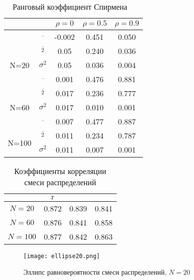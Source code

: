\documentclass[14pt]{extarticle}
\DeclareMathOperator{\pirs}{r} %
\DeclareMathOperator{\qdrnt}{r_Q} %
\DeclareMathOperator{\spir}{r_S} %
\begin{document}
\begin{table}[H]
    \centering
    \begin{tabular}{|c|c|c|c|c|}
        \hline 
        &  & \(\rho=0\) & \(\rho=0.5\) & \(\rho=0.9\) \\
        \hline
        
        & \(\overline{\spir}\) & -0.002 & 0.451 & 0.050 \\ \cline{2-5} 
        \multirow{3}{*}{N=20} & \(\overline{\spir^2}\) & 0.05 & 0.240 & 0.036 \\ \cline{2-5} 
        &  \(\sigma_{\spir}^2\) & 0.05 & 0.036 & 0.004 \\ \cline{1-5} 
        
        & \(\overline{\spir}\) & 0.001 & 0.476 & 0.881 \\ \cline{2-5} 
        \multirow{3}{*}{N=60} & \(\overline{\spir^2}\) & 0.017 & 0.236 & 0.777 \\ \cline{2-5} 
        &  \(\sigma_{\spir}^2\) & 0.017 & 0.010 & 0.001 \\ \cline{1-5} 

        & \(\overline{\spir}\) & 0.007 & 0.477 & 0.887 \\ \cline{2-5} 
        \multirow{3}{*}{N=100} & \(\overline{\spir^2}\) & 0.011 & 0.234 & 0.787 \\ \cline{2-5} 
        &  \(\sigma_{\spir}^2\) & 0.011 & 0.007 & 0.001 \\ \cline{1-5} 
        
        \end{tabular}
    \caption{Ранговый коэффициент Спирмена \(\spir\)}
    \label{tab:my-table}
\end{table}

\begin{table}[H]
    \centering
    \begin{tabular}{|c|c|c|c|}
        \toprule
         & \(\pirs\) & \(\qdrnt\) & \(\spir\) \\
        \toprule 
        \(N=20\) & 0.872 & 0.839 & 0.841 \\
        \midrule
        \(N=60\) & 0.876 & 0.841 & 0.858 \\
        \midrule
        \(N=100\) & 0.877 & 0.842 & 0.863 \\
        \toprule
    \end{tabular}
    \caption{Коэффициенты корреляции смеси распределений}
    \label{tab:my_label}
\end{table}

\begin{figure}[H]
    \centering
    \texttt{[image: ellipse20.png]}
    \caption{Эллипс равновероятности смеси распределений, \(N=20\)}
    \label{fig:enter-label}
\end{figure}
\end{document}
